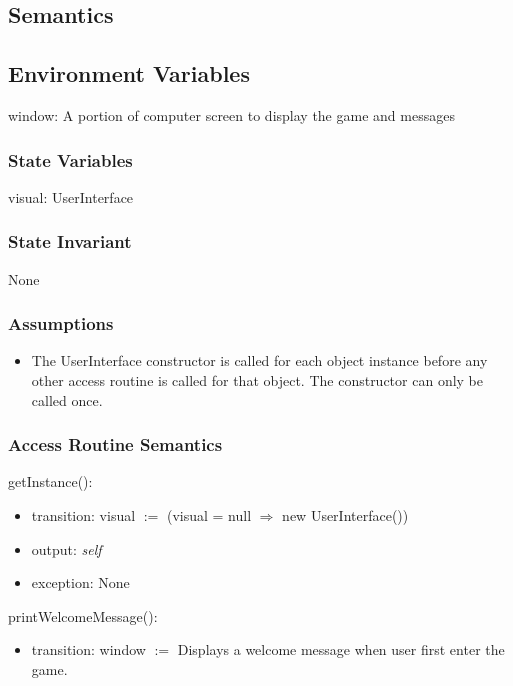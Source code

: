 \documentclass[12pt]{article}
\begin{document}
\subsection* {Semantics}

\subsection*{Environment Variables}

window: A portion of computer screen to display the game and messages

\subsubsection* {State Variables}

visual: UserInterface

\subsubsection* {State Invariant}

None

\subsubsection* {Assumptions}

\begin{itemize}
\item The UserInterface constructor is called for each object instance before any
other access routine is called for that object.  The constructor can only be
called once.
\end{itemize}

\subsubsection* {Access Routine Semantics}

\noindent getInstance():
\begin{itemize}
  \item transition: visual $:=$ (visual = null $\Rightarrow$ new UserInterface())
  \item output: \textit{self}
  \item exception: None
\end{itemize}

\noindent printWelcomeMessage():
\begin{itemize}
\item transition: window $:=$ Displays a welcome message when user first enter the game.
\end{itemize}
\end{document}
